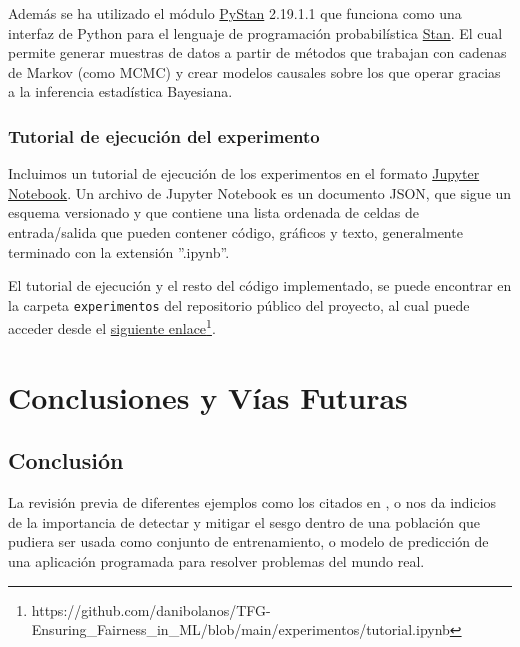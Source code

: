 \documentclass[oneside,openright,titlepage,numbers=noenddot,openany,headinclude,footinclude=true,
cleardoublepage=empty,abstractoff,BCOR=5mm,paper=a4,fontsize=12pt,main=spanish]{scrreprt}
\begin{document}
Además se ha utilizado el módulo \href{https://pystan.readthedocs.io/en/latest}{PyStan} 2.19.1.1 que funciona como una interfaz de Python para el lenguaje de programación probabilística \href{https://mc-stan.org}{Stan}. El cual permite generar muestras de datos a partir de métodos que trabajan con cadenas de Markov (como MCMC) y crear modelos causales sobre los que operar gracias a la inferencia estadística Bayesiana.

\section{Tutorial de ejecución del experimento} \label{sec:manual}

Incluimos un tutorial de ejecución de los experimentos en el formato \href{https://jupyter.org/documentation}{Jupyter Notebook}. Un archivo de Jupyter Notebook es un documento JSON, que sigue un esquema versionado y que contiene una lista ordenada de celdas de entrada/salida que pueden contener código, gráficos y texto, generalmente terminado con la extensión ''.ipynb''. 

El tutorial de ejecución y el resto del código implementado, se puede encontrar en la carpeta \texttt{experimentos} del repositorio público del proyecto, al cual puede acceder desde el \href{https://github.com/danibolanos/TFG-Ensuring_Fairness_in_ML/blob/main/experimentos/tutorial.ipynb}{siguiente enlace}\footnote{https://github.com/danibolanos/TFG-Ensuring\_Fairness\_in\_ML/blob/main/experimentos/tutorial.ipynb}.

\part{Conclusiones y Vías Futuras} \label{part:debate_fut}

\chapter{Conclusión} \label{ch:conclusion}

La revisión previa de diferentes ejemplos como los citados en \cite{prestamo2018}, \cite{contratar2015} o \cite{condena2016} nos da indicios de la importancia de detectar y mitigar el sesgo dentro de una población que pudiera ser usada como conjunto de entrenamiento, o modelo de predicción de una aplicación programada para resolver problemas del mundo real. 
\end{document}
